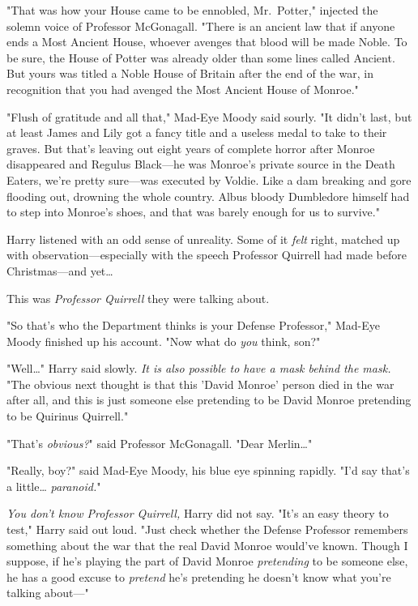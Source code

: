 "That was how your House came to be ennobled, Mr.~Potter," injected the solemn voice of Professor McGonagall. "There is an ancient law that if anyone ends a Most Ancient House, whoever avenges that blood will be made Noble. To be sure, the House of Potter was already older than some lines called Ancient. But yours was titled a Noble House of Britain after the end of the war, in recognition that you had avenged the Most Ancient House of Monroe."

"Flush of gratitude and all that," Mad-Eye Moody said sourly. "It didn't last, but at least James and Lily got a fancy title and a useless medal to take to their graves. But that's leaving out eight years of complete horror after Monroe disappeared and Regulus Black---he was Monroe's private source in the Death Eaters, we're pretty sure---was executed by Voldie. Like a dam breaking and gore flooding out, drowning the whole country. Albus bloody Dumbledore himself had to step into Monroe's shoes, and that was barely enough for us to survive."

Harry listened with an odd sense of unreality. Some of it \emph{felt} right, matched up with observation---especially with the speech Professor Quirrell had made before Christmas---and yet{\ldots}

This was \emph{Professor Quirrell} they were talking about.

"So that's who the Department thinks is your Defense Professor," Mad-Eye Moody finished up his account. "Now what do \emph{you} think, son?"

"Well{\ldots}" Harry said slowly. \emph{It is also possible to have a mask behind the mask.} "The obvious next thought is that this 'David Monroe' person died in the war after all, and this is just someone else pretending to be David Monroe pretending to be Quirinus Quirrell."

"That's \emph{obvious?}" said Professor McGonagall. "Dear Merlin{\ldots}"

"Really, boy?" said Mad-Eye Moody, his blue eye spinning rapidly. "I'd say that's a little{\ldots} \emph{paranoid.}"

\emph{You don't know Professor Quirrell,} Harry did not say. "It's an easy theory to test," Harry said out loud. "Just check whether the Defense Professor remembers something about the war that the real David Monroe would've known. Though I suppose, if he's playing the part of David Monroe \emph{pretending} to be someone else, he has a good excuse to \emph{pretend} he's pretending he doesn't know what you're talking about---"


